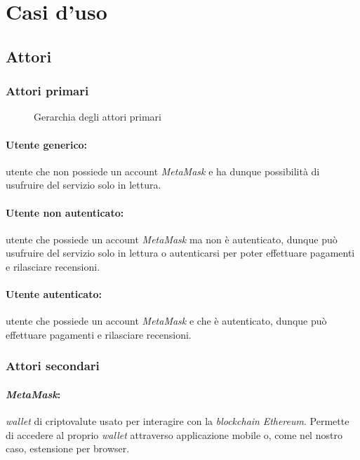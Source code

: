 \section{Casi d'uso}

    \subsection{Attori}

        \subsubsection{Attori primari}
            \begin{figure}[H]
                \centering
                
                \caption{Gerarchia degli attori primari}
            \end{figure}

            \paragraph*{Utente generico:} utente che non possiede un account \textit{MetaMask} e ha dunque possibilità di usufruire del servizio solo in lettura.

            \paragraph*{Utente non autenticato:} utente che possiede un account \textit{MetaMask} ma non è autenticato, dunque può usufruire del servizio solo in lettura o autenticarsi per poter effettuare pagamenti e rilasciare recensioni.

            \paragraph*{Utente autenticato:} utente che possiede un account \textit{MetaMask} e che è autenticato, dunque può effettuare pagamenti e rilasciare recensioni.

        \subsubsection{Attori secondari}
            \paragraph*{\textit{MetaMask}:} \textit{wallet}\glo\: di criptovalute usato per interagire con la \textit{blockchain} \textit{Ethereum}. Permette di accedere al proprio \textit{wallet} attraverso applicazione mobile o, come nel nostro caso, estensione per browser.


